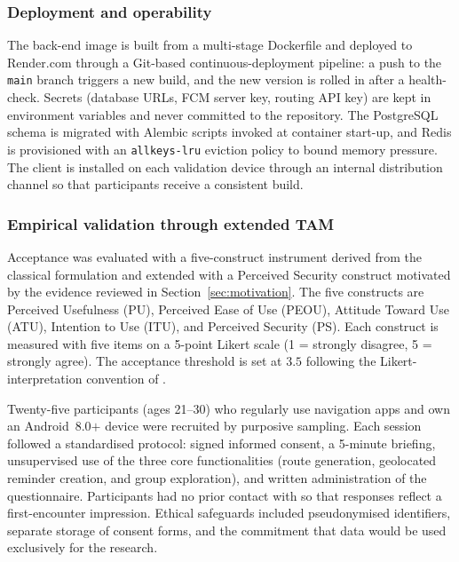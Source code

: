 \documentclass[a4paper,fleqn]{cas-sc}
\begin{document}
	\subsubsection{Deployment and operability}\label{sec:deploy}
	
	The back-end image is built from a multi-stage Dockerfile and deployed to Render.com through a Git-based continuous-deployment pipeline: a push to the \texttt{main} branch triggers a new build, and the new version is rolled in after a health-check. Secrets (database URLs, FCM server key, routing API key) are kept in environment variables and never committed to the repository. The PostgreSQL schema is migrated with Alembic scripts invoked at container start-up, and Redis is provisioned with an \texttt{allkeys-lru} eviction policy to bound memory pressure. The client is installed on each validation device through an internal distribution channel so that participants receive a consistent build.
	
	\subsubsection{Empirical validation through extended TAM}\label{sec:tam-method}
	
	Acceptance was evaluated with a five-construct \TAM{} instrument derived from the classical formulation \citep{davis1989tam} and extended with a Perceived Security construct motivated by the evidence reviewed in Section~\ref{sec:motivation}. The five constructs are Perceived Usefulness (PU), Perceived Ease of Use (PEOU), Attitude Toward Use (ATU), Intention to Use (ITU), and Perceived Security (PS). Each construct is measured with five items on a 5-point Likert scale (1 = strongly disagree, 5 = strongly agree). The acceptance threshold is set at $3.5$ following the Likert-interpretation convention of \citet{lindner2024likert}.
	
	Twenty-five participants (ages 21--30) who regularly use navigation apps and own an Android~8.0$+$ device were recruited by purposive sampling. Each session followed a standardised protocol: signed informed consent, a 5-minute briefing, unsupervised use of the three core functionalities (route generation, geolocated reminder creation, and group exploration), and written administration of the questionnaire. Participants had no prior contact with \RUTAI{} so that responses reflect a first-encounter impression. Ethical safeguards included pseudonymised identifiers, separate storage of consent forms, and the commitment that data would be used exclusively for the research.
	
\end{document}
